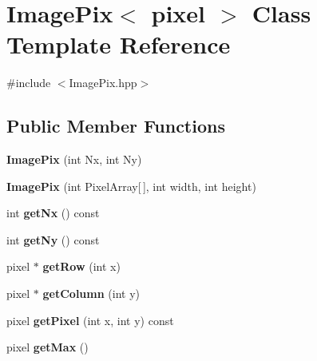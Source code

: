 \hypertarget{class_image_pix}{}\section{Image\+Pix$<$ pixel $>$ Class Template Reference}
\label{class_image_pix}


{\ttfamily \#include $<$Image\+Pix.\+hpp$>$}

\subsection*{Public Member Functions}
\begin{DoxyCompactItemize}
\item 
\mbox{\label{class_image_pix_a17f15a447ea6c728e78be078dbc39c50}} 
{\bfseries Image\+Pix} (int Nx, int Ny)
\item 
\mbox{\label{class_image_pix_a0f23257cc21d600b6b2416fc91a26eb2}} 
{\bfseries Image\+Pix} (int Pixel\+Array\mbox{[}$\,$\mbox{]}, int width, int height)
\item 
\mbox{\label{class_image_pix_ab8c59910169f25c2a8e2636a020383cf}} 
int {\bfseries get\+Nx} () const
\item 
\mbox{\label{class_image_pix_a14889774c915f6e33d1338441ed90c59}} 
int {\bfseries get\+Ny} () const
\item 
\mbox{\label{class_image_pix_a358e87a17ee723b335f03eebfa79a070}} 
pixel $\ast$ {\bfseries get\+Row} (int x)
\item 
\mbox{\label{class_image_pix_a3f90c5b98fe6336fddd09be724dc1c2e}} 
pixel $\ast$ {\bfseries get\+Column} (int y)
\item 
\mbox{\label{class_image_pix_a96e1577e600cc1cd0733d7785ffb030a}} 
pixel {\bfseries get\+Pixel} (int x, int y) const
\item 
\mbox{\label{class_image_pix_a866b265addb010f1c4ec9d377521ba84}} 
pixel {\bfseries get\+Max} ()
\item 
\mbox{\label{class_image_pix_a41fc615e80bb4d560dde39be2f9fb839}} 

\end{DoxyCompactItemize}
